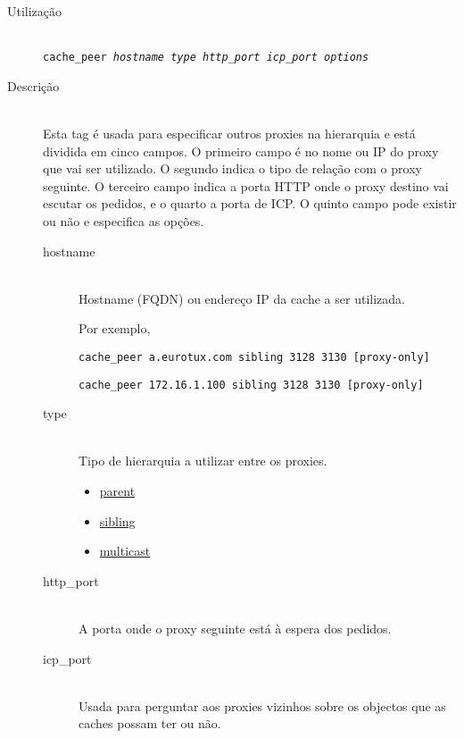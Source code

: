 \begin{description}
\item[Utilização]~\\
\texttt{cache\_peer \emph{hostname} \emph{type}
\emph{http\_port} \emph{icp\_port} \emph{options}}

\item[Descrição]~\\
Esta tag é usada para especificar outros proxies na hierarquia e
está dividida em cinco campos.
O primeiro campo é no nome ou IP do proxy que vai ser utilizado.
O segundo indica o tipo de relação com o proxy seguinte.
O terceiro campo indica a porta HTTP onde o proxy destino vai
escutar os pedidos, e o quarto a porta de ICP.
O quinto campo pode existir ou não e especifica as opções.

\begin{description}
\item[hostname]~\\
Hostname (FQDN) ou endereço IP da cache a ser utilizada.

Por exemplo,

\texttt{cache\_peer a.eurotux.com sibling 3128 3130 [proxy{}-only]}

\texttt{cache\_peer 172.16.1.100 sibling 3128 3130 [proxy{}-only]}

\item[type]~\\
Tipo de hierarquia a utilizar entre os proxies.

\begin{itemize}
\item
\href{http://squid.visolve.com/squid/squid24s1/glossary.htm#parent}{parent}

\item
\href{http://squid.visolve.com/squid/squid24s1/glossary.htm#sibling}{sibling}

\item
\href{http://squid.visolve.com/squid/squid24s1/glossary.htm#multicast}{multicast}
\end{itemize}

\item[http\_port]~\\
A porta onde o proxy seguinte está à espera dos pedidos.

\item[icp\_port]~\\

Usada para perguntar aos proxies vizinhos sobre os objectos que as caches possam ter ou não.


\end{description}
\end{description}
